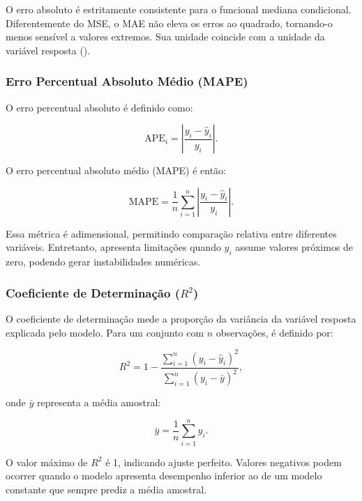 O erro absoluto é estritamente consistente para o funcional mediana condicional. Diferentemente do MSE, o MAE não eleva os erros ao quadrado, tornando-o menos sensível a valores extremos. Sua unidade coincide com a unidade da variável resposta (\cite{Fissler2022ModelComparison}).

\subsubsection*{Erro Percentual Absoluto Médio (MAPE)}

O erro percentual absoluto é definido como:

\begin{equation}
\mathrm{APE}_i = \left| \frac{y_i - \hat{y}_i}{y_i} \right|.
\end{equation}

O erro percentual absoluto médio (MAPE) é então:

\begin{equation}
\mathrm{MAPE} = \frac{1}{n} \sum_{i=1}^{n} 
\left| \frac{y_i - \hat{y}_i}{y_i} \right|.
\end{equation}

Essa métrica é adimensional, permitindo comparação relativa entre diferentes variáveis. Entretanto, apresenta limitações quando $y_i$ assume valores próximos de zero, podendo gerar instabilidades numéricas.

\subsubsection*{Coeficiente de Determinação ($R^2$)}

O coeficiente de determinação mede a proporção da variância da variável resposta explicada pelo modelo. Para um conjunto com $n$ observações, é definido por:

\begin{equation}
R^2 = 1 - 
\frac{\sum_{i=1}^{n}(y_i - \hat{y}_i)^2}
{\sum_{i=1}^{n}(y_i - \bar{y})^2},
\end{equation}

onde $\bar{y}$ representa a média amostral:

\begin{equation}
\bar{y} = \frac{1}{n}\sum_{i=1}^{n} y_i.
\end{equation}

O valor máximo de $R^2$ é 1, indicando ajuste perfeito. Valores negativos podem ocorrer quando o modelo apresenta desempenho inferior ao de um modelo constante que sempre prediz a média amostral.

